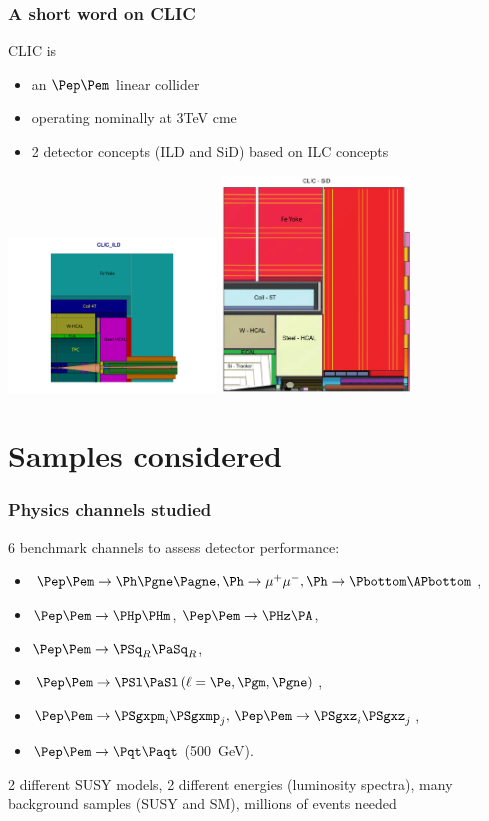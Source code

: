 \documentclass{beamer}
\begin{document}
\begin{frame}
\frametitle{A short word on CLIC}
CLIC is
\begin{itemize}
  \item an $\Pep\Pem$ linear collider
  \item operating nominally at 3TeV cme
  \item 2 detector concepts (ILD and SiD) based on ILC concepts
\end{itemize}
\begin{center}
\includegraphics[width=5.5cm]{./CLIC_ILD_xz_box_view1.pdf}
\includegraphics[width=5cm]{./CLIC_SiD_xz.pdf}
\end{center}
\end{frame}

\section{Samples considered}
\begin{frame}
\frametitle{Physics channels studied}
6 benchmark channels to assess detector performance:
\begin{itemize}
\item $\Pep\Pem \to \Ph \Pgne \Pagne, \Ph \to \mu^+\mu^-, \Ph \to
\Pbottom\APbottom$,
\item  $\Pep\Pem \to \PHp \PHm$, $\Pep\Pem \to \PHz \PA$, 
\item $\Pep\Pem \to \PSq_R \PaSq_R$, 
\item $\Pep\Pem \to \PSl \PaSl \,(\ell = \Pe,\Pgm,\Pgne)$, 
\item $\Pep\Pem \to \PSgxpm_i \PSgxmp_j,\, \Pep\Pem \to \PSgxz_i \PSgxz_j$,
\item  $\Pep\Pem \to \Pqt \Paqt$ (500~GeV).
\end{itemize}
2 different SUSY models, 2 different energies (luminosity spectra), many
background samples (SUSY and SM), millions of events needed
\end{frame}
\end{document}

